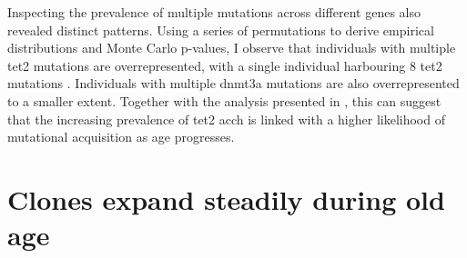 \begin{figure}[!ht]
	\label{fig:ch-magnitude-increase}
\end{figure}

\begin{figure}[!ht]
	\label{fig:ch-prevalence-increase}
\end{figure}

\begin{figure}[!ht]
	\label{fig:ch-prevalence-genes}
\end{figure}

Inspecting the prevalence of multiple mutations across different genes also revealed distinct patterns. Using a series of permutations to derive empirical distributions and Monte Carlo p-values, I observe that individuals with multiple \ac{tet2} mutations are overrepresented, with a single individual harbouring 8 \ac{tet2} mutations . Individuals with multiple \ac{dnmt3a} mutations are also overrepresented to a smaller extent. Together with the analysis presented in , this can suggest that the increasing prevalence of \ac{tet2} ac{ch} is linked with a higher likelihood of mutational acquisition as age progresses. 

\begin{figure}[!ht]
	\label{fig:ch-mutations-per-gene}
\end{figure}

\section{Clones expand steadily during old age}


